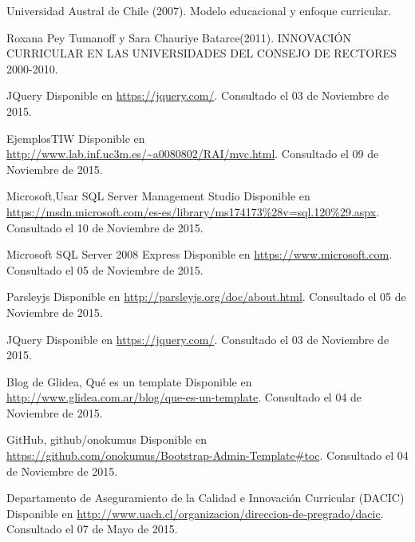 \begin{spacing}{1.0}
\begin{thebibliography}{99}  

\newblock Universidad Austral de Chile (2007).
\newblock Modelo educacional y enfoque curricular. 

\newblock Roxana Pey Tumanoff y Sara Chauriye Batarce(2011).
\newblock INNOVACIÓN CURRICULAR EN LAS UNIVERSIDADES DEL CONSEJO DE RECTORES 2000-2010. 


\newblock JQuery
\newblock Disponible en \url{https://jquery.com/}.
\newblock Consultado el 03 de Noviembre de 2015.

\newblock EjemplosTIW
\newblock Disponible en \url{http://www.lab.inf.uc3m.es/~a0080802/RAI/mvc.html}.
\newblock Consultado el 09 de Noviembre de 2015.

\newblock Microsoft,Usar SQL Server Management Studio
\newblock Disponible en \url{https://msdn.microsoft.com/es-es/library/ms174173%28v=sql.120%29.aspx}.
\newblock Consultado el 10 de Noviembre de 2015.

\newblock Microsoft SQL Server 2008 Express 
\newblock Disponible en \url{https://www.microsoft.com}.
\newblock Consultado el 05 de Noviembre de 2015.

\newblock Parsleyjs
\newblock Disponible en \url{http://parsleyjs.org/doc/about.html}.
\newblock Consultado el 05 de Noviembre de 2015.

\newblock JQuery
\newblock Disponible en \url{https://jquery.com/}.
\newblock Consultado el 03 de Noviembre de 2015.

\newblock Blog de Glidea, Qué es un template
\newblock Disponible en \url{http://www.glidea.com.ar/blog/que-es-un-template}.
\newblock Consultado el 04 de Noviembre de 2015.

\newblock GitHub, github/onokumus
\newblock Disponible en \url{https://github.com/onokumus/Bootstrap-Admin-Template#toc}.
\newblock Consultado el 04 de Noviembre de 2015.

\newblock Departamento de Aseguramiento de la Calidad e Innovación Curricular (DACIC)
\newblock Disponible en \url{http://www.uach.cl/organizacion/direccion-de-pregrado/dacic}.
\newblock Consultado el 07 de Mayo de 2015.


\end{thebibliography}
\end{spacing}
